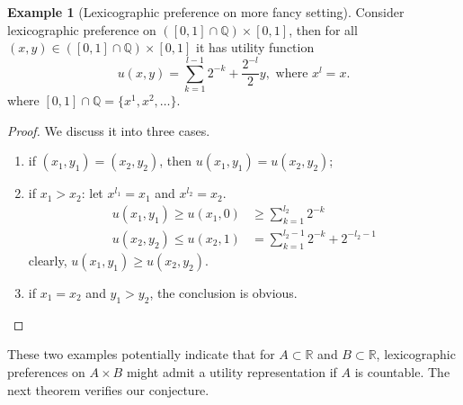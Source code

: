 \documentclass[a4paper, 12pt]{article}
\theoremstyle{definition}
\newtheorem{example}{Example}
\newcommand{\summation}[2]{\sum_{#1}^{#2}}
\begin{document}
\begin{example}[Lexicographic preference on more fancy setting]
Consider lexicographic preference on $([0,1]\cap\mathbb{Q})\times [0,1]$, then for all $(x,y)\in([0,1]\cap\mathbb{Q})\times [0,1]$ it has utility function
\[
u(x,y) = \summation{k=1}{l-1}2^{-k}+\frac{2^{-l}}{2}y,\text{ where }x^l=x.
\]
where $[0,1]\cap\mathbb{Q}=\{x^1,x^2,\dots\}$.
\begin{proof}
We discuss it into three cases.
\begin{enumerate}[label = (\roman*)]
\item if $(x_1,y_1)=(x_2,y_2)$, then $u(x_1,y_1) = u(x_2,y_2)$;
\item if $x_1>x_2$: let $x^{l_1}=x_1$ and $x^{l_2}=x_2$. 
\begin{align*}
u(x_1,y_1)\geq u(x_1,0)&\geq \summation{k=1}{l_2}2^{-k}\\
u(x_2,y_2)\leq u(x_2,1)&=\summation{k=1}{l_2-1}2^{-k}+2^{-l_2-1}
\end{align*}
clearly, $u(x_1,y_1)\geq u(x_2,y_2)$.
\item if $x_1=x_2$ and $y_1>y_2$, the conclusion is obvious.
\end{enumerate}
\end{proof}
\end{example}

These two examples potentially indicate that for $A\subset\mathbb{R}$ and $B\subset\mathbb{R}$, lexicographic preferences on $A\times B$ might admit a utility representation if $A$ is countable. The next theorem verifies our conjecture.
\end{document}
